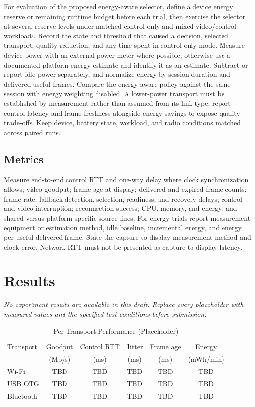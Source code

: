 \documentclass[conference]{IEEEtran}
\begin{document}
For evaluation of the proposed energy-aware selector, define a device energy reserve or remaining
runtime budget before each trial, then exercise the selector at several
reserve levels under matched control-only and mixed video/control workloads.
Record the state and threshold that caused a decision, selected transport,
quality reduction, and any time spent in control-only mode. Measure device
power with an external power meter where possible; otherwise use a documented
platform energy estimate and identify it as an estimate. Subtract or report
idle power separately, and normalize energy by session duration and delivered
useful frames. Compare the energy-aware policy against the same session with
energy weighting disabled. A lower-power transport must be established by
measurement rather than assumed from its link type; report control latency
and frame freshness alongside energy savings to expose quality trade-offs.
Keep device, battery state, workload, and radio conditions matched across
paired runs.

\subsection{Metrics}
Measure end-to-end control RTT and one-way delay where clock synchronization
allows; video goodput; frame age at display; delivered and expired frame
counts; frame rate; fallback detection, selection, readiness, and recovery
delays; control and video interruption; reconnection success; CPU, memory,
and energy; and shared versus platform-specific source lines. For energy
trials report measurement equipment or estimation method, idle baseline,
incremental energy, and energy per useful delivered frame. State the
capture-to-display measurement method and clock error. Network RTT must not
be presented as capture-to-display latency.

\section{Results}
\textit{No experiment results are available in this draft. Replace every
placeholder with measured values and the specified test conditions before
submission.}

\begin{table}[t]
\caption{Per-Transport Performance (Placeholder)}
\label{tab:transport-results}
\centering
\begin{tabular}{lccccc}
\toprule
Transport & Goodput & Control RTT & Jitter & Frame age & Energy\\
 & (Mb/s) & (ms) & (ms) & (ms) & (mWh/min)\\
\midrule
Wi-Fi & TBD & TBD & TBD & TBD & TBD\\
USB OTG & TBD & TBD & TBD & TBD & TBD\\
Bluetooth & TBD & TBD & TBD & TBD & TBD\\
\bottomrule
\end{tabular}
\end{table}
\end{document}
